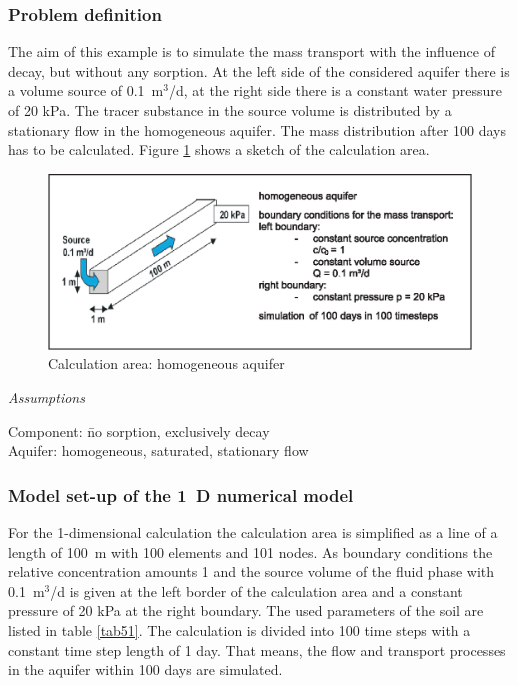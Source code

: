 \subsubsection*{Problem definition}

The aim of this example is to simulate the mass transport with the influence of decay, but without any sorption. At the left side of the considered aquifer there is a volume source of 0.1~m$^3$/d, at the right side there is a constant water pressure of 20 kPa. The tracer substance in the source volume is distributed by a stationary flow in the homogeneous aquifer. The mass distribution after 100 days has to be calculated. Figure \ref{fig51} shows a sketch of the calculation area.

\begin{figure}[htbp]
\centering
\includegraphics[width=1.0\textwidth]{C/figures/fig51.eps}
\caption{Calculation area: homogeneous aquifer}
\label{fig51}
\end{figure}

\textsl{Assumptions}

\begin{tabbing}
Component: \= no sorption, exclusively decay \\
Aquifer: \> homogeneous, saturated, stationary flow \\
\end{tabbing}

\subsubsection*{Model set-up of the 1~D numerical model}

For the 1-dimensional calculation the calculation area is simplified as a line of a length of 100~m with 100 elements and 101 nodes. As boundary conditions the relative concentration amounts 1 and the source volume of the fluid phase with 0.1~m$^3$/d is given at the left border of the calculation area and a constant pressure of 20 kPa at the right boundary. The used parameters of the soil are listed in table \ref{tab51}. The calculation is divided into 100 time steps with a constant time step length of 1 day. That means, the flow and transport processes in the aquifer within 100 days are simulated.

